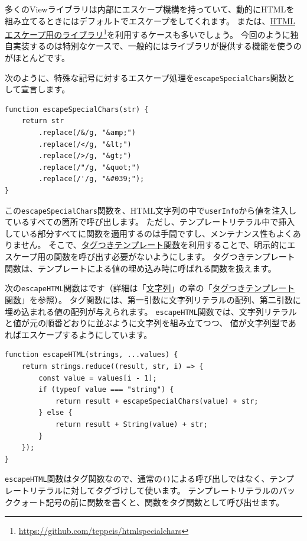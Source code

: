 多くのViewライブラリは内部にエスケープ機構を持っていて、動的にHTMLを組み立てるときにはデフォルトでエスケープをしてくれます。
または、\href{https://github.com/teppeis/htmlspecialchars}{HTMLエスケープ用のライブラリ}\footnote{\url{https://github.com/teppeis/htmlspecialchars}}を利用するケースも多いでしょう。
今回のように独自実装するのは特別なケースで、一般的にはライブラリが提供する機能を使うのがほとんどです。

次のように、特殊な記号に対するエスケープ処理を\texttt{escapeSpecialChars}関数として宣言します。

\begin{lstlisting}
function escapeSpecialChars(str) {
    return str
        .replace(/&/g, "&amp;")
        .replace(/</g, "&lt;")
        .replace(/>/g, "&gt;")
        .replace(/"/g, "&quot;")
        .replace(/'/g, "&#039;");
}
\end{lstlisting}

この\texttt{escapeSpecialChars}関数を、HTML文字列の中で\texttt{userInfo}から値を注入しているすべての箇所で呼び出します。
ただし、テンプレートリテラル中で挿入している部分すべてに関数を適用するのは手間ですし、メンテナンス性もよくありません。
そこで、\hyperlink{tagged-template-function}{タグつきテンプレート関数}を利用することで、明示的にエスケープ用の関数を呼び出す必要がないようにします。
タグつきテンプレート関数は、テンプレートによる値の埋め込み時に呼ばれる関数を扱えます。

次の\texttt{escapeHTML}関数は\textbf{}です（詳細は「\hyperlink{string}{文字列}」の章の「\hyperlink{tagged-template-function}{タグつきテンプレート関数}」を参照）。
タグ関数には、第一引数に文字列リテラルの配列、第二引数に埋め込まれる値の配列が与えられます。
\texttt{escapeHTML}関数では、文字列リテラルと値が元の順番どおりに並ぶように文字列を組み立てつつ、
値が文字列型であればエスケープするようにしています。

\begin{lstlisting}
function escapeHTML(strings, ...values) {
    return strings.reduce((result, str, i) => {
        const value = values[i - 1];
        if (typeof value === "string") {
            return result + escapeSpecialChars(value) + str;
        } else {
            return result + String(value) + str;
        }
    });  
}
\end{lstlisting}

\texttt{escapeHTML}関数はタグ関数なので、通常の\texttt{()}による呼び出しではなく、テンプレートリテラルに対してタグづけして使います。
テンプレートリテラルのバッククォート記号の前に関数を書くと、関数をタグ関数として呼び出せます。

